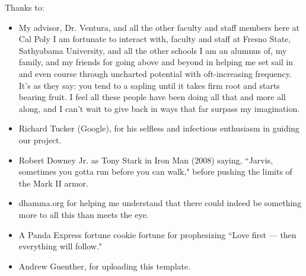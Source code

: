 \noindent
Thanks to:
\begin{itemize}
    \item My advisor, Dr. Ventura, and all the other faculty and staff members here at Cal Poly I am fortunate to interact with, faculty and staff at Fresno State, Sathyabama University, and all the other schools I am an alumnus of, my family, and my friends for going above and beyond in helping me set sail in and even course through uncharted potential with oft-increasing frequency. It's as they say: you tend to a sapling until it takes firm root and starts bearing fruit. I feel all these people have been doing all that and more all along, and I can't wait to give back in ways that far surpass my imagination.
    \item Richard Tucker (Google), for his selfless and infectious enthusiasm in guiding our project.
    \item Robert Downey Jr. as Tony Stark in Iron Man (2008) saying, ``Jarvis, sometimes you gotta run before you can walk," before pushing the limits of the Mark II armor.
    \item dhamma.org for helping me understand that there could indeed be something more to all this than meets the eye.
    \item A Panda Express fortune cookie fortune for prophesizing ``Love first --- then everything will follow."
    \item Andrew Guenther, for uploading this template.
\end{itemize}
